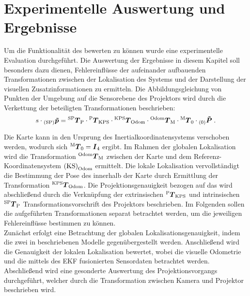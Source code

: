 \chapter{Experimentelle Auswertung und Ergebnisse}
\label{chap.results}
\prever{
}


Um die Funktionalität des  bewerten zu können wurde eine experimentelle Evaluation durchgeführt. Die Auswertung der Ergebnisse in diesem Kapitel soll besonders dazu dienen, Fehlereinflüsse der aufeinander aufbauenden Transformationen zwischen der Lokalisation des Systems und der Darstellung der visuellen Zusatzinformationen zu ermitteln. Die Abbildungsgleichung von Punkten der Umgebung auf die Sensorebene des Projektors wird durch die Verkettung der beteiligten Transformationen beschrieben:
%
\begin{equation}
s \cdot {_{{\mathrm{(SP)}}}}\mbox{\boldmath{$\tilde{p}$}} = {^{\mathrm{SP}}\mbox{\boldmath{$T$}}_{\mathrm{P}}}\cdot{^{\mathrm{P}}\mbox{\boldmath{$T$}}_{\mathrm{KPS}}}\cdot{^{\mathrm{KPS}}\mbox{\boldmath{$T$}}_{\mathrm{Odom}}}\cdot{^{\mathrm{Odom}}\mbox{\boldmath{$T$}}_{\mathrm{M}}}\cdot{^{\mathrm{M}}\mbox{\boldmath{$T$}}_{\mathrm{0}}}\cdot{_{{\mathrm{(0)}}}}\mbox{\boldmath{$\tilde{P}$}} \; \text{.}
\end{equation}

Die Karte kann in den Ursprung des Inertialkoordinatensystems verschoben werden, wodurch sich ${^{\mathrm{M}}\mbox{\boldmath{$T$}}_{\mathrm{0}}} = \mbox{\boldmath{$I$}}_{\mathrm{4}}$ ergibt. Im Rahmen der globalen Lokalisation wird die Transformation ${^{\mathrm{Odom}}\mbox{\boldmath{$T$}}_{\mathrm{M}}}$ zwischen der Karte und dem Referenz-Koordinatensystem ${\mathrm{(KS)}}_{\mathrm{Odom}}$ ermittelt. Die lokale Lokalisation vervollständigt die Bestimmung der Pose des  innerhalb der Karte durch Ermittlung der Transformation ${^{\mathrm{KPS}}\mbox{\boldmath{$T$}}_{\mathrm{Odom}}}$. Die Projektionsgenauigkeit bezogen auf das \kps{} wird abschließend durch die Verknüpfung der extrinsischen ${^{\mathrm{P}}\mbox{\boldmath{$T$}}_{\mathrm{KPS}}}$ und intrinsischen ${^{\mathrm{SP}}\mbox{\boldmath{$T$}}_{\mathrm{P}}}$ Transformationsvorschrift des Projektors beschrieben. Im Folgenden sollen die aufgeführten Transformationen separat betrachtet werden, um die jeweiligen Fehlereinflüsse bestimmen zu können.\\

\prever{
}
Zunächst erfolgt eine Betrachtung der globalen Lokalisationsgenauigkeit, indem die zwei in  beschriebenen Modelle gegenübergestellt werden. Anschließend wird die Genauigkeit der lokalen Lokalisation bewertet, wobei die visuelle Odometrie und die mittels des EKF fusionierten Sensordaten betrachtet werden. Abschließend wird eine gesonderte Auswertung des Projektionsvorgangs durchgeführt, welcher durch die Transformation zwischen Kamera und Projektor beschrieben wird.\\

